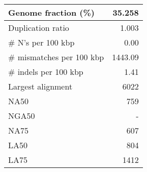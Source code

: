 \documentclass[12pt,a4paper]{article}
\begin{document}
\begin{table}[ht]
\begin{center}
\begin{tabular}{|l*{1}{|r}|}
Genome fraction (\%) & 35.258 \\ \hline
Duplication ratio & 1.003 \\ \hline
\# N's per 100 kbp & 0.00 \\ \hline
\# mismatches per 100 kbp & 1443.09 \\ \hline
\# indels per 100 kbp & 1.41 \\ \hline
Largest alignment & 6022 \\ \hline
NA50 & 759 \\ \hline
NGA50 & - \\ \hline
NA75 & 607 \\ \hline
LA50 & 804 \\ \hline
LA75 & 1412 \\ \hline
\end{tabular}
\end{center}
\end{table}
\end{document}
